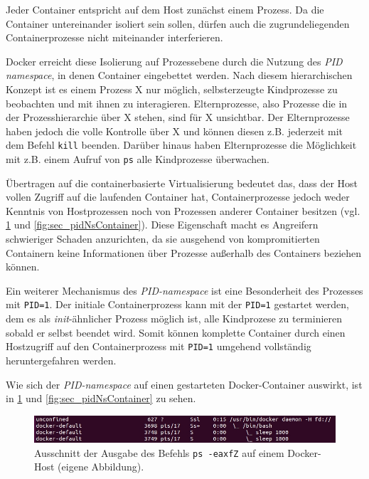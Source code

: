 \documentclass[../main.tex]{subfiles}
\begin{document}
			Jeder Container entspricht auf dem Host zunächst einem Prozess. Da die Container untereinander isoliert sein sollen, dürfen auch die zugrundeliegenden Containerprozesse nicht miteinander interferieren.

			Docker erreicht diese Isolierung auf Prozessebene durch die Nutzung des \emph{\acrshort{PID} namespace}, in denen Container eingebettet werden. Nach diesem hierarchischen Konzept ist es einem Prozess X nur möglich, selbsterzeugte Kindprozesse zu beobachten und mit ihnen zu interagieren. Elternprozesse, also Prozesse die in der Prozesshierarchie über X stehen, sind für X unsichtbar. Der Elternprozesse haben jedoch die volle Kontrolle über X und können diesen z.B. jederzeit mit dem Befehl \texttt{kill} beenden. Darüber hinaus haben Elternprozesse die Möglichkeit mit z.B. einem Aufruf von \texttt{ps} alle Kindprozesse überwachen.

			Übertragen auf die containerbasierte Virtualisierung bedeutet das, dass der Host vollen Zugriff auf die laufenden Container hat, Containerprozesse jedoch weder Kenntnis von Hostprozessen noch von Prozessen anderer Container besitzen (vgl. \fig \ref{fig:sec_pidNsHost} und \fig \ref{fig:sec_pidNsContainer}). Diese Eigenschaft macht es Angreifern schwieriger Schaden anzurichten, da sie ausgehend von kompromitierten Containern keine Informationen über Prozesse außerhalb des Containers beziehen können.

			Ein weiterer Mechanismus des \emph{\acrshort{PID}-namespace} ist eine Besonderheit des Prozesses mit \texttt{PID=1}. Der initiale Containerprozess kann mit der \texttt{PID=1} gestartet werden, dem es als \emph{init}-ähnlicher Prozess möglich ist, alle Kindprozese zu terminieren sobald er selbst beendet wird. Somit können komplette Container durch einen Hostzugriff auf den Containerprozess mit \texttt{PID=1} umgehend vollständig heruntergefahren werden.

			Wie sich der \emph{\acrshort{PID}-namespace} auf einen gestarteten Docker-Container auswirkt, ist in \fig \ref{fig:sec_pidNsHost} und \fig \ref{fig:sec_pidNsContainer} zu sehen.

			\begin{figure}[h]
					\centering
					\includegraphics[width=1.0\textwidth]{./images/sec_pidNsHost.jpg}
					\caption{Ausschnitt der Ausgabe des Befehls \texttt{ps -eaxfZ} auf einem Docker-Host (eigene Abbildung).}
					\label{fig:sec_pidNsHost}
			\end{figure}
\end{document}
